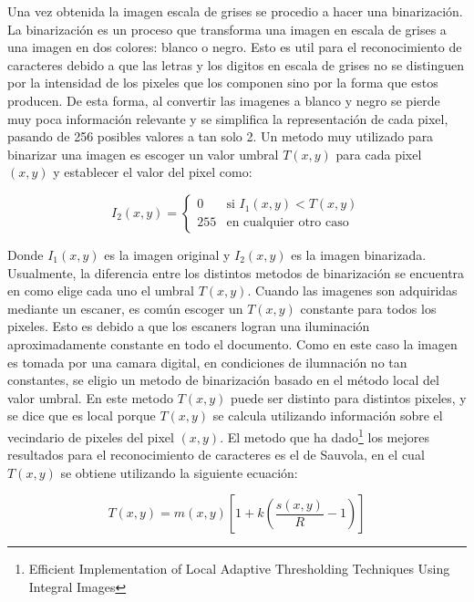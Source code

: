 \documentclass[a4paper, 11pt, oneside]{report}
\begin{document}
Una vez obtenida la imagen escala de grises se procedio a hacer una binarización. La binarización es un proceso que transforma una imagen en escala de grises a una imagen en dos colores: blanco o negro. Esto es util para el reconocimiento de caracteres debido a que las letras y los digitos en escala de grises no se distinguen por la intensidad de los pixeles que los componen sino por la forma que estos producen. De esta forma, al convertir las imagenes a blanco y negro se pierde muy poca información relevante y se simplifica la representación de cada pixel, pasando de 256 posibles valores a tan solo 2. Un metodo muy utilizado para binarizar una imagen es escoger un valor umbral $T(x,y)$ para cada pixel $(x,y)$ y establecer el valor del pixel como:

\begin{equation}\label{binEq}
 I_2(x,y) = \left\{ \begin{array}{ll}
	0   & \mbox{si $I_1(x,y) < T(x,y)$} \\
	255 & \mbox{en cualquier otro caso}
\end{array} \right. 
\end{equation}

Donde $I_1(x,y)$ es la imagen original y $I_2(x,y)$ es la imagen binarizada. Usualmente, la diferencia entre los distintos metodos de binarización se encuentra en como elige cada uno el umbral $T(x,y)$.\newline
Cuando las imagenes son adquiridas mediante un escaner, es común escoger un $T(x,y)$ constante para todos los pixeles. Esto es debido a que los escaners logran una iluminación aproximadamente constante en todo el documento. Como en este caso la imagen es tomada por una camara digital, en condiciones de ilumnación no tan constantes, se eligio un metodo de binarización basado en el método local del valor umbral. En este metodo $T(x,y)$ puede ser distinto para distintos pixeles, y se dice que es local porque $T(x,y)$ se calcula utilizando información sobre el vecindario de pixeles del pixel $(x,y)$. El metodo que ha dado\footnote{Efficient Implementation of Local Adaptive Thresholding Techniques Using Integral Images} los mejores resultados para el reconocimiento de caracteres es el de Sauvola, en el cual $T(x,y)$ se obtiene utilizando la siguiente ecuación:

\begin{equation}
      T(x,y)=m(x,y)\left[ 1 + k(\frac{s(x,y)}{R}-1) \right]
\end{equation}
\end{document}
